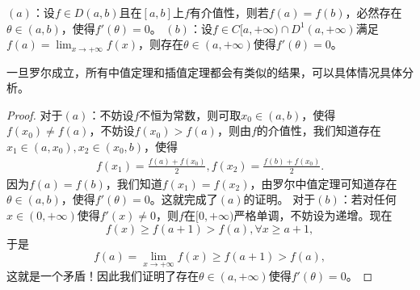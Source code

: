 \documentclass[../../main.tex]{subfiles}
\begin{document}
\begin{theorem}[加强的Rolle中值定理]\label{theorem:加强的Rolle中值定理}
\((a)\)：设\(f \in D(a,b)\)且在\([a,b]\)上\(f\)有介值性，则若\(f(a)=f(b)\)，必然存在\(\theta \in (a,b)\)，使得\(f'(\theta)=0\)。
\((b)\)：设\(f \in C[a,+\infty)\cap D^{1}(a,+\infty)\)满足\(f(a)=\lim_{x \to +\infty}f(x)\)，则存在\(\theta \in (a,+\infty)\)使得\(f'(\theta)=0\)。
\end{theorem}
\begin{note}
一旦罗尔成立，所有中值定理和插值定理都会有类似的结果，可以具体情况具体分析。
\end{note}
\begin{proof}
对于\((a)\)：不妨设\(f\)不恒为常数，则可取\(x_0 \in (a,b)\)，使得\(f(x_0)\neq f(a)\)，不妨设\(f(x_0)>f(a)\)，则由\(f\)的介值性，我们知道存在\(x_1 \in (a,x_0),x_2 \in (x_0,b)\)，使得
\begin{align*}
f(x_1)=\frac{f(a)+f(x_0)}{2},f(x_2)=\frac{f(b)+f(x_0)}{2}.
\end{align*}
因为\(f(a)=f(b)\)，我们知道\(f(x_1)=f(x_2)\)，由罗尔中值定理可知道存在\(\theta \in (a,b)\)，使得\(f'(\theta)=0\)。这就完成了\((a)\)的证明。
对于\((b)\)：若对任何\(x \in (0,+\infty)\)使得\(f'(x)\neq 0\)，则\(f\)在\([0,+\infty)\)严格单调，不妨设为递增。现在
\[f(x)\geqslant f(a + 1)>f(a),\forall x\geqslant a + 1,\]
于是
\[f(a)=\lim_{x \to +\infty}f(x)\geqslant f(a + 1)>f(a),\]
这就是一个矛盾！因此我们证明了存在\(\theta \in (a,+\infty)\)使得\(f'(\theta)=0\)。    
\end{proof}
\end{document}
